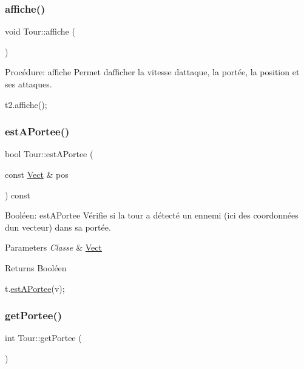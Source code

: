 \subsubsection{\texorpdfstring{affiche()}{affiche()}}
{\footnotesize\ttfamily void Tour\+::affiche (\begin{DoxyParamCaption}{ }\end{DoxyParamCaption})}



Procédure\+: affiche Permet d\textquotesingle{}afficher la vitesse d\textquotesingle{}attaque, la portée, la position et ses attaques. 


\begin{DoxyCode}
t2.affiche();
\end{DoxyCode}
 \mbox{\label{classTour_ad9f4d42370374f373f48f7d0fb36559a}} 
\subsubsection{\texorpdfstring{est\+A\+Portee()}{estAPortee()}}
{\footnotesize\ttfamily bool Tour\+::est\+A\+Portee (\begin{DoxyParamCaption}\item[{const \hyperlink{classVect}{Vect} \&}]{pos }\end{DoxyParamCaption}) const}



Booléen\+: est\+A\+Portee Vérifie si la tour a détecté un ennemi (ici des coordonnées d\textquotesingle{}un vecteur) dans sa portée. 


\begin{DoxyParams}{Parameters}
{\em Classe} & \hyperlink{classVect}{Vect} \\
\hline
\end{DoxyParams}
\begin{DoxyReturn}{Returns}
Booléen 
\begin{DoxyCode}
t.\hyperlink{classTour_ad9f4d42370374f373f48f7d0fb36559a}{estAPortee}(v);
\end{DoxyCode}
 
\end{DoxyReturn}
\mbox{\label{classTour_a4c0b40ef85678f12cc7a3e78588094e8}} 
\subsubsection{\texorpdfstring{get\+Portee()}{getPortee()}}
{\footnotesize\ttfamily int Tour\+::get\+Portee (\begin{DoxyParamCaption}{ }\end{DoxyParamCaption})}



